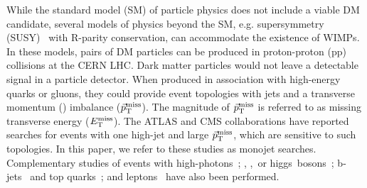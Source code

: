 While the standard model (SM) of particle physics does not include a
viable DM candidate, several models of physics beyond the SM, e.g.
supersymmetry (SUSY)~\cite{Ramond,Golfand,Volkov,Wess,Fayet} with R-parity
conservation, can accommodate the existence of WIMPs. In these models,
pairs of DM particles can be produced in proton-proton (pp) collisions at
the CERN LHC. Dark matter particles would not leave a detectable signal in
a particle detector. When produced in association with high-energy
quarks or gluons, they could provide event topologies with
jets and a transverse momentum (\pt) imbalance ($\vec{p}_{\rm T}^{\rm miss}$). 
The magnitude of $\vec{p}_{\rm T}^{\rm miss}$ is referred to as missing transverse energy ($E_{\rm T}^{\rm{miss}}$).
The ATLAS and CMS collaborations have reported
~\cite{Aad:2011xw,Chatrchyan:2012me} searches for events with one
high-\pt jet and large $\vec{p}_{\rm T}^{\rm miss}$, which are sensitive to such topologies.
In this paper, we refer to these studies as monojet searches. Complementary studies of events with
high-\pt photons~\cite{Khachatryan:2014rwa,Aad:2014tda}; \PW,
\cPZ,~or
higgs~bosons~\cite{Aad:2013oja,Aad:2014vka,Aad:2015dva,Aad:2015yga};
b-jets~\cite{Aad:2014vea} and top quarks~\cite{Aad:2014vea,CMS:b2g12-022,CMS:semilepTop}; and leptons~\cite{ATLAS:2014wra,Khachatryan:2014tva}
have also been performed.

